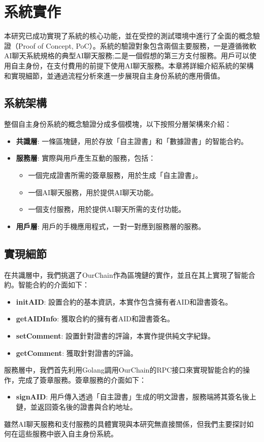 
\chapter{系統實作}
本研究已成功實現了系統的核心功能，並在受控的測試環境中進行了全面的概念驗證（Proof of Concept, PoC）。系統的驗證對象包含兩個主要服務，一是遵循微軟AI聊天系統規格\cite{microsoft_ai_chat_protocol}的典型AI聊天服務;二是一個假想的第三方支付服務。用戶可以使用自主身份，在支付費用的前提下使用AI聊天服務。本章將詳細介紹系統的架構和實現細節，並通過流程分析來進一步展現自主身份系統的應用價值。
\section{系統架構}
整個自主身份系統的概念驗證分成多個模塊，以下按照分層架構來介紹：
\begin{itemize}
  \item \textbf{共識層}: 一條區塊鏈，用於存放「自主證書」和「數據證書」的智能合約。
  \item \textbf{服務層}: 實際與用戶產生互動的服務，包括：
        \begin{itemize}
          \item 一個完成證書所需的簽章服務，用於生成「自主證書」。
          \item 一個AI聊天服務，用於提供AI聊天功能。
          \item 一個支付服務，用於提供AI聊天所需的支付功能。
        \end{itemize}
  \item \textbf{用戶層}: 用戶的手機應用程式，一對一對應到服務層的服務。
\end{itemize}
\section{實現細節}
在共識層中，我們挑選了OurChain\cite{ourlab408_ourchain}作為區塊鏈的實作，並且在其上實現了智能合約。智能合約的介面如下：
\begin{itemize}
  \item \textbf{initAID}: 設置合約的基本資訊，本實作包含擁有者AID和證書簽名。
  \item \textbf{getAIDInfo}: 獲取合約的擁有者AID和證書簽名。
  \item \textbf{setComment}: 設置針對證書的評論，本實作提供純文字紀錄。
  \item \textbf{getComment}: 獲取針對證書的評論。
\end{itemize}
服務層中，我們首先利用Golang調用OurChain的RPC接口來實現智能合約的操作，完成了簽章服務。簽章服務的介面如下：
\begin{itemize}
  \item \textbf{signAID}: 用戶傳入透過「自主證書」生成的明文證書，服務端將其簽名後上鏈，並返回簽名後的證書與合約地址。
\end{itemize}
雖然AI聊天服務和支付服務的具體實現與本研究無直接關係，但我們主要探討如何在這些服務中嵌入自主身份系統。

